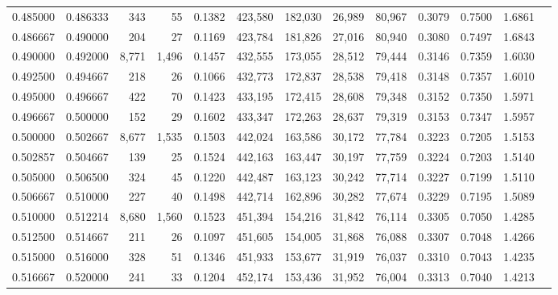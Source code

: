 \begin{tabular}{rrrrrrrrrrrrr}
0.485000 & 0.486333 &    343 &    55 &                                     0.1382 & 423,580 & 182,030 &  26,989 &  80,967 & 0.3079 & 0.7500 & 1.6861 \\
0.486667 & 0.490000 &    204 &    27 &                                     0.1169 & 423,784 & 181,826 &  27,016 &  80,940 & 0.3080 & 0.7497 & 1.6843 \\
0.490000 & 0.492000 &  8,771 & 1,496 &                                     0.1457 & 432,555 & 173,055 &  28,512 &  79,444 & 0.3146 & 0.7359 & 1.6030 \\
0.492500 & 0.494667 &    218 &    26 &                                     0.1066 & 432,773 & 172,837 &  28,538 &  79,418 & 0.3148 & 0.7357 & 1.6010 \\
0.495000 & 0.496667 &    422 &    70 &                                     0.1423 & 433,195 & 172,415 &  28,608 &  79,348 & 0.3152 & 0.7350 & 1.5971 \\
0.496667 & 0.500000 &    152 &    29 &                                     0.1602 & 433,347 & 172,263 &  28,637 &  79,319 & 0.3153 & 0.7347 & 1.5957 \\
0.500000 & 0.502667 &  8,677 & 1,535 &                                     0.1503 & 442,024 & 163,586 &  30,172 &  77,784 & 0.3223 & 0.7205 & 1.5153 \\
0.502857 & 0.504667 &    139 &    25 &                                     0.1524 & 442,163 & 163,447 &  30,197 &  77,759 & 0.3224 & 0.7203 & 1.5140 \\
0.505000 & 0.506500 &    324 &    45 &                                     0.1220 & 442,487 & 163,123 &  30,242 &  77,714 & 0.3227 & 0.7199 & 1.5110 \\
0.506667 & 0.510000 &    227 &    40 &                                     0.1498 & 442,714 & 162,896 &  30,282 &  77,674 & 0.3229 & 0.7195 & 1.5089 \\
0.510000 & 0.512214 &  8,680 & 1,560 &                                     0.1523 & 451,394 & 154,216 &  31,842 &  76,114 & 0.3305 & 0.7050 & 1.4285 \\
0.512500 & 0.514667 &    211 &    26 &                                     0.1097 & 451,605 & 154,005 &  31,868 &  76,088 & 0.3307 & 0.7048 & 1.4266 \\
0.515000 & 0.516000 &    328 &    51 &                                     0.1346 & 451,933 & 153,677 &  31,919 &  76,037 & 0.3310 & 0.7043 & 1.4235 \\
0.516667 & 0.520000 &    241 &    33 &                                     0.1204 & 452,174 & 153,436 &  31,952 &  76,004 & 0.3313 & 0.7040 & 1.4213 \\

\end{tabular}
